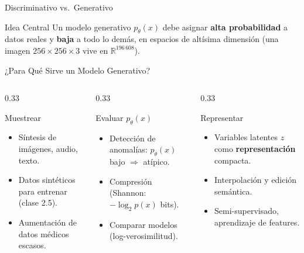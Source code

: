 \documentclass[aspectratio=169, 10pt]{beamer}
\providecommand{\R}{\mathbb{R}}
\begin{document}
\begin{frame}[shrink]{Discriminativo vs.\ Generativo}
	\begin{alertblock}{Idea Central}
		Un modelo generativo $p_\theta(x)$ debe asignar \textbf{alta probabilidad} a datos reales y \textbf{baja} a todo lo dem\'as, en espacios de alt\'isima dimensi\'on (una imagen $256 \times 256 \times 3$ vive en $\R^{196\,608}$).
	\end{alertblock}

\end{frame}

\begin{frame}{¿Para Qu\'e Sirve un Modelo Generativo?}

	\begin{columns}[T]
		\begin{column}{0.33\textwidth}
			\begin{block}{Muestrear}
				\small
				\begin{itemize}
					\item S\'intesis de im\'agenes, audio, texto.
					\item Datos sint\'eticos para entrenar (clase 2.5).
					\item Aumentaci\'on de datos m\'edicos escasos.
				\end{itemize}
			\end{block}
		\end{column}

		\begin{column}{0.33\textwidth}
			\begin{block}{Evaluar $p_\theta(x)$}
				\small
				\begin{itemize}
					\item Detecci\'on de anomal\'ias: $p_\theta(x)$ bajo $\Rightarrow$ at\'ipico.
					\item Compresi\'on (Shannon: $-\log_2 p(x)$ bits).
					\item Comparar modelos (log-verosimilitud).
				\end{itemize}
			\end{block}
		\end{column}

		\begin{column}{0.33\textwidth}
			\begin{block}{Representar}
				\small
				\begin{itemize}
					\item Variables latentes $z$ como \textbf{representaci\'on} compacta.
					\item Interpolaci\'on y edici\'on sem\'antica.
					\item Semi-supervisado, aprendizaje de features.
				\end{itemize}
			\end{block}
		\end{column}
	\end{columns}


\end{frame}
\end{document}
